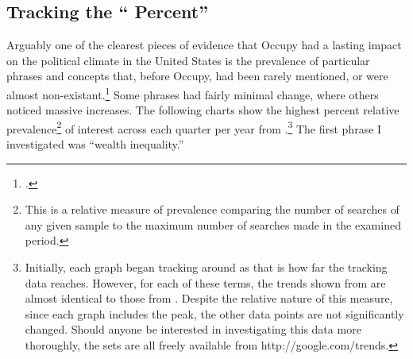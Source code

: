 \documentclass[openany,twoside]{memoir}
\begin{document}
\begin{Spacing}{2}
\subsection{Tracking the `` Percent''}
Arguably one of the clearest pieces of evidence that Occupy had a lasting impact on the political climate in the United States is the prevalence of particular phrases and concepts that, before Occupy, had been rarely mentioned, or were almost non-existant.\footcite[
Not all analysts agree, of course. 
For a more critical analysis of the staying power of terms used surrounding the Occupy movement, see][]{knefel12}
Some phrases had fairly minimal change, where others noticed massive increases.
The following charts show the highest percent relative prevalence\footnote{
This is a relative measure of prevalence comparing the number of searches of any given sample to the maximum number of searches made in the examined period.} 
of interest across each quarter per year from .\footnote{
Initially, each graph began tracking around  as that is how far the tracking data reaches.
However, for each of these terms, the trends shown from  are almost identical to those from .
Despite the relative nature of this measure, since each graph includes the peak, the other data points are not significantly changed.
Should anyone be interested in investigating this data more thoroughly, the sets are all freely available from http://google.com/trends.}
The first phrase I investigated was ``wealth inequality.''


\end{Spacing}
\end{document}
